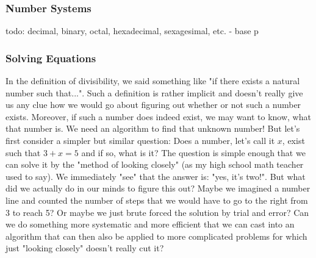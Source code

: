 


\subsubsection{Number Systems}
todo: decimal, binary, octal, hexadecimal, sexagesimal, etc. - base p


\subsubsection{Solving Equations}
In the definition of divisibility, we said something like "if there exists a natural number such that...". Such a definition is rather implicit and doesn't really give us any clue how we would go about figuring out whether or not such a number exists. Moreover, if such a number does indeed exist, we may want to know, what that number is. We need an algorithm to find that unknown number! But let's first consider a simpler but similar question: Does a number, let's call it $x$, exist such that $3 + x = 5$ and if so, what is it? The question is simple enough that we can solve it by the "method of looking closely" (as my high school math teacher used to say). We immediately "see" that the answer is: "yes, it's two!". But what did we actually do in our minds to figure this out? Maybe we imagined a number line and counted the number of steps that we would have to go to the right from 3 to reach 5? Or maybe we just brute forced the solution by trial and error? Can we do something more systematic and more efficient that we can cast into an algorithm that can then also be applied to more complicated problems for which just "looking closely" doesn't really cut it? 

